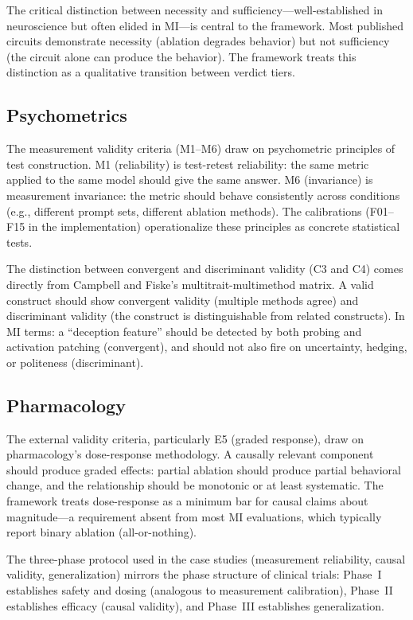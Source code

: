 \documentclass[10pt]{article}
\newcommand{\eg}{e.g.}
\begin{document}
The critical distinction between necessity and sufficiency---well-established in neuroscience but often elided in MI---is central to the framework. Most published circuits demonstrate necessity (ablation degrades behavior) but not sufficiency (the circuit alone can produce the behavior). The framework treats this distinction as a qualitative transition between verdict tiers.

\subsection{Psychometrics}
\label{sec:psychometrics}

The measurement validity criteria (M1--M6) draw on psychometric principles of test construction. M1 (reliability) is test-retest reliability: the same metric applied to the same model should give the same answer. M6 (invariance) is measurement invariance: the metric should behave consistently across conditions (\eg, different prompt sets, different ablation methods). The calibrations (F01--F15 in the implementation) operationalize these principles as concrete statistical tests.

The distinction between convergent and discriminant validity (C3 and C4) comes directly from Campbell and Fiske's multitrait-multimethod matrix. A valid construct should show convergent validity (multiple methods agree) and discriminant validity (the construct is distinguishable from related constructs). In MI terms: a ``deception feature'' should be detected by both probing and activation patching (convergent), and should not also fire on uncertainty, hedging, or politeness (discriminant).

\subsection{Pharmacology}
\label{sec:pharma}

The external validity criteria, particularly E5 (graded response), draw on pharmacology's dose-response methodology. A causally relevant component should produce graded effects: partial ablation should produce partial behavioral change, and the relationship should be monotonic or at least systematic. The framework treats dose-response as a minimum bar for causal claims about magnitude---a requirement absent from most MI evaluations, which typically report binary ablation (all-or-nothing).

The three-phase protocol used in the case studies (measurement reliability, causal validity, generalization) mirrors the phase structure of clinical trials: Phase~I establishes safety and dosing (analogous to measurement calibration), Phase~II establishes efficacy (causal validity), and Phase~III establishes generalization.
\end{document}
